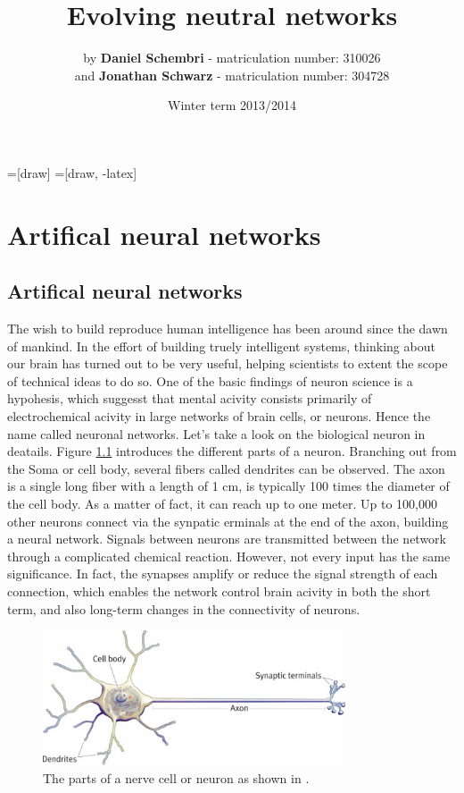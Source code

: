 \documentclass[10pt,a4paper,DIV=11]{scrreprt}
\title
{
    Evolving neutral networks\\
}
\author
{
    by \textbf{Daniel Schembri} - matriculation number: 310026 \\
    and \textbf{Jonathan Schwarz} - matriculation number: 304728
}
\date
{
    Winter term 2013/2014
}
\begin{document}
=[draw]
=[draw, -latex] 


\maketitle
\thispagestyle{empty}
\newpage
{\large\tableofcontents}
\newpage

\chapter{Artifical neural networks}
\section{Artifical neural networks}
The wish to build reproduce human intelligence has been around since the dawn of mankind. In the effort of building truely intelligent systems, thinking about our brain has turned out to be very useful, helping scientists to extent the scope of technical ideas to do so. One of the basic findings of neuron science is a hypohesis, which suggesst that mental acivity consists primarily of electrochemical acivity in large networks of brain cells, or neurons. Hence the name called neuronal networks. Let's take a look on the biological neuron in deatails. Figure \ref{fig:neuron} introduces the different parts of a neuron. Branching out from the Soma or cell body, several fibers called dendrites can be observed. The axon is a single long fiber with a length of 1 cm, is typically 100 times the diameter of the cell body. As a matter of fact, it can reach up to one meter. Up to 100,000 other neurons connect via the synpatic erminals at the end of the axon, building a neural network. Signals between neurons are transmitted between the network through a complicated chemical reaction. However, not every input has the same significance. In fact, the synapses amplify or reduce the signal strength of each connection, which enables the network control brain acivity in both the short term, and also long-term changes in the connectivity of neurons.

\begin{center}
\begin{figure}[H]
\includegraphics[width=0.8\textwidth,scale=1]{files/neuron.jpg}  
\caption{The parts of a nerve cell or neuron as shown in \cite{NEU}.}
\label{fig:neuron}
\end{figure}
\end{center}
\end{document}
